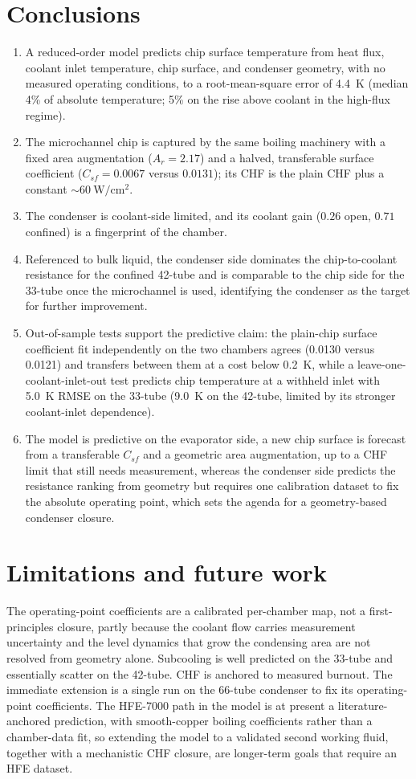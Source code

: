 \documentclass[11pt]{article}
\begin{document}
\section{Conclusions}
\begin{enumerate}
\item A reduced-order model predicts chip surface temperature from heat flux, coolant inlet
temperature, chip surface, and condenser geometry, with no measured operating conditions, to a
root-mean-square error of 4.4~K (median 4\% of absolute temperature; 5\% on the rise above coolant
in the high-flux regime).
\item The microchannel chip is captured by the same boiling machinery with a fixed area
augmentation ($A_r=2.17$) and a halved, transferable surface coefficient ($C_{sf}=0.0067$ versus
$0.0131$); its CHF is the plain CHF plus a constant $\sim\!60~\mathrm{W/cm^2}$.
\item The condenser is coolant-side limited, and its coolant gain ($0.26$ open, $0.71$ confined)
is a fingerprint of the chamber.
\item Referenced to bulk liquid, the condenser side dominates the chip-to-coolant resistance for
the confined 42-tube and is comparable to the chip side for the 33-tube once the microchannel is
used, identifying the condenser as the target for further improvement.
\item Out-of-sample tests support the predictive claim: the plain-chip surface coefficient fit
independently on the two chambers agrees (0.0130 versus 0.0121) and transfers between them at a cost
below 0.2~K, while a leave-one-coolant-inlet-out test predicts chip temperature at a withheld inlet
with 5.0~K RMSE on the 33-tube (9.0~K on the 42-tube, limited by its stronger coolant-inlet
dependence).
\item The model is predictive on the evaporator side, a new chip surface is forecast from a
transferable $C_{sf}$ and a geometric area augmentation, up to a CHF limit that still needs
measurement, whereas the condenser side predicts the resistance ranking from geometry but
requires one calibration dataset to fix the absolute operating point, which sets the agenda for a
geometry-based condenser closure.
\end{enumerate}

\section{Limitations and future work}
The operating-point coefficients are a calibrated per-chamber map, not a first-principles closure,
partly because the coolant flow carries measurement uncertainty and the level dynamics that grow
the condensing area are not resolved from geometry alone. Subcooling is well predicted on the
33-tube and essentially scatter on the 42-tube. CHF is anchored to measured burnout. The immediate
extension is a single run on the 66-tube condenser to fix its operating-point coefficients. The
HFE-7000 path in the model is at present a literature-anchored prediction, with smooth-copper boiling
coefficients rather than a chamber-data fit, so extending the model to a validated second working
fluid, together with a mechanistic CHF closure, are longer-term goals that require an HFE dataset.
\end{document}

